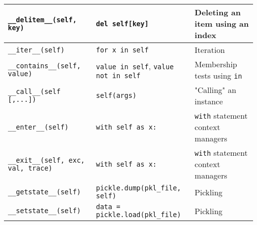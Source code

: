 \documentclass[a4paper,11pt]{article}
\newcommand{\code}[1]{\texttt{#1}}
\begin{document}
\begin{center}
\begin{tabular}{| p{5cm} | p{5cm} | p{5cm} |}
\hline
\code{__delitem__(self, key)} & \code{del self[key]} & Deleting an item using an index\\
\hline
\code{__iter__(self)} & \code{for x in self} & Iteration\\
\hline
\code{__contains__(self, value)} & \code{value in self}, \code{value not in self} & Membership tests using \code{in}\\
\hline
\code{__call__(self [,...])} & \code{self(args)} & "Calling" an instance\\
\hline
\code{__enter__(self)} & \code{with self as x:} & \code{with} statement context managers\\
\hline
\code{__exit__(self, exc, val, trace)} & \code{with self as x:} & \code{with} statement context managers\\
\hline
\code{__getstate__(self)} & \code{pickle.dump(pkl_file, self)} & Pickling\\
\hline
\code{__setstate__(self)} & \code{data = pickle.load(pkl_file)} & Pickling\\
\hline
\end{tabular}
\end{center}
\end{document}
